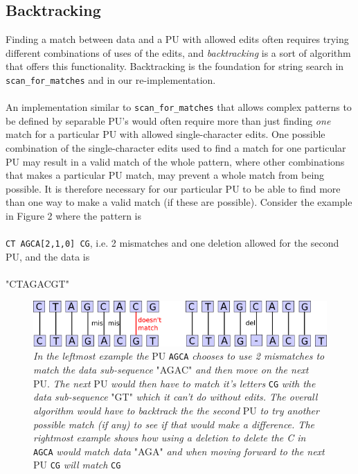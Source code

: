 \documentclass[12pt]{article}
\newcommand{\scm}{\texttt{scan\_for\_matches} }
\newcommand{\pu}{PU }
\newcommand{\pus}{PU's }
\newcommand{\pup}{PU. }
\begin{document}
\subsection{Backtracking}
Finding a match between data and a \pu with allowed edits often requires trying 
different combinations of uses of the edits, and \emph{backtracking} is a sort of algorithm that offers this functionality.
Backtracking is the foundation for string search in \scm and in our re-implementation. \\ \\
An implementation similar to
\scm that allows complex patterns to be defined by separable \pus would often require more than just finding \textit{one}
match for a particular \pu with allowed single-character edits. One possible combination of the single-character
edits used to find a match for one particular \pu may result in a valid match of the whole pattern, 
where other combinations that makes a particular \pu match, may prevent a whole match from being possible.
It is therefore necessary for our particular \pu to be able to find more than one way to make a valid match (if these are
possible). Consider the example in Figure 2 where the pattern is \\ \\
\texttt{CT\; AGCA[2,1,0]\; CG}, i.e. 2 mismatches and
one deletion allowed for the second PU, and the data is \\ \\
"CTAGACGT"
\begin{figure}[H]
\begin{center}
\includegraphics[scale=0.8]{Diagrams/back.png}
\end{center}
\caption{\textit{In the leftmost example the} \pu \texttt{AGCA} \textit{chooses to use 2 mismatches to match the 
data sub-sequence} "AGAC" \textit{and then move on the next} \pup \textit{The next} \pu
\textit{would then have to match it's letters} \texttt{CG} \textit{with the data sub-sequence} "GT"
\textit{which it can't do without edits. The overall algorithm would have to backtrack the the second
} \pu \textit{to try another possible match (if any) to see if that would make a difference. The rightmost example
shows how using a deletion to delete the C in} \texttt{AGCA} \textit{would match data} "AGA" \textit{and
when moving forward to the next} \pu \texttt{CG} \textit{will match} \texttt{CG}}
\end{figure}
\end{document}
